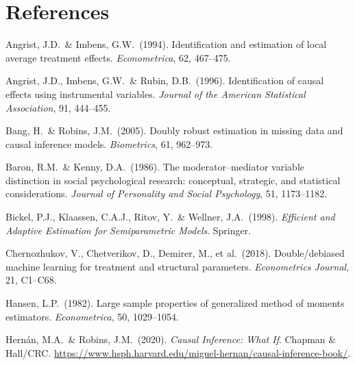 \documentclass[12pt]{article}
\begin{document}
\section*{References}

\begingroup
\small
\begin{description}[leftmargin=1.8em, labelindent=0pt, itemsep=3pt]
  \item Angrist, J.D.\ \& Imbens, G.W.\ (1994).
    Identification and estimation of local average treatment effects.
    \textit{Econometrica}, 62, 467--475.

  \item Angrist, J.D., Imbens, G.W.\ \& Rubin, D.B.\ (1996).
    Identification of causal effects using instrumental variables.
    \textit{Journal of the American Statistical Association}, 91, 444--455.

  \item Bang, H.\ \& Robins, J.M.\ (2005).
    Doubly robust estimation in missing data and causal inference models.
    \textit{Biometrics}, 61, 962--973.

  \item Baron, R.M.\ \& Kenny, D.A.\ (1986).
    The moderator--mediator variable distinction in social psychological
    research: conceptual, strategic, and statistical considerations.
    \textit{Journal of Personality and Social Psychology}, 51, 1173--1182.

  \item Bickel, P.J., Klaassen, C.A.J., Ritov, Y.\ \& Wellner, J.A.\
    (1998).
    \textit{Efficient and Adaptive Estimation for Semiparametric Models}.
    Springer.

  \item Chernozhukov, V., Chetverikov, D., Demirer, M., et al.\ (2018).
    Double/debiased machine learning for treatment and structural
    parameters. \textit{Econometrics Journal}, 21, C1--C68.

  \item Hansen, L.P.\ (1982).
    Large sample properties of generalized method of moments estimators.
    \textit{Econometrica}, 50, 1029--1054.

  \item Hern\'an, M.A.\ \& Robins, J.M.\ (2020).
    \textit{Causal Inference: What If}.
    Chapman \& Hall/CRC.
    \url{https://www.hsph.harvard.edu/miguel-hernan/causal-inference-book/}.


\end{description}
\end{document}
